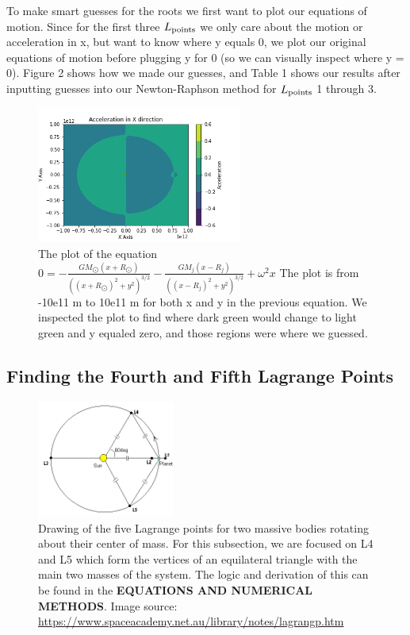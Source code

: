 \documentclass[linenumbers,RNAAS,trackchanges]{aastex631}
\begin{document}
    \noindent
    To make smart guesses for the roots we first want to plot our equations of motion. Since for the first three $L_{\textup{points}}$ we only care about the motion or acceleration in x, but want to know where y equals 0, we plot our original equations of motion before plugging y for 0 (so we can visually inspect where y = 0). Figure 2 shows how we made our guesses, and Table 1 shows our results after inputting guesses into our Newton-Raphson method for $L_{\textup{points}}$ 1 through 3.

    \begin{figure}[H]
         \centering
         \includegraphics[width=0.6\textwidth]{ax_plot.png}
         \caption{ The plot of the equation $\displaystyle 0 = - \frac{G M_{\bigodot} (x + R_{\bigodot})}{((x + R_{\bigodot})^2 + y^2)^{3/2}} - \frac{G M_j (x - R_j)} {((x - R_{j})^2 + y^2)^{3/2}} + \omega^2 x$ The plot is from -10e11 m to 10e11 m for both x and y in the previous equation. We inspected the plot to find where dark green would change to light green and y equaled zero, and those regions were where we guessed.}
    \end{figure}
    
    \subsection{\textbf{Finding the Fourth and Fifth Lagrange Points}}
    
    \begin{figure}[H]
         \centering
         \includegraphics[width=0.4\textwidth]{lpoints.png}
         \caption{Drawing of the five Lagrange points for two massive bodies rotating about their center of mass. For this subsection, we are focused on L4 and L5 which form the vertices of an equilateral triangle with the main two masses of the system. The logic and derivation of this can be found in the \textbf{EQUATIONS AND NUMERICAL METHODS}. Image source: \url{https://www.spaceacademy.net.au/library/notes/lagrangp.htm}}
    \end{figure}
    
\end{document}
